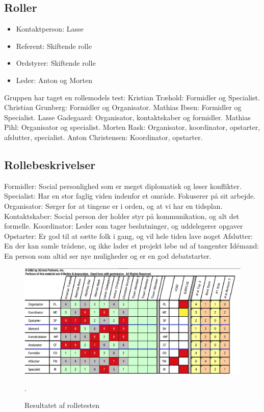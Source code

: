 \documentclass[oneside,a4paper,titlepage]{article}
\begin{document}
\subsection*{Roller}
\begin{itemize}
  \item Kontaktperson: Lasse
  \item Referent: Skiftende rolle
  \item Ordstyrer: Skiftende rolle
  \item Leder: Anton og Morten
\end{itemize}
Gruppen har taget en rollemodels test: \newline
Kristian Træhold: Formidler og Specialist. \newline
Christian Grunberg: Formidler og Organisator.\newline
Mathias Ibsen: Formidler og Specialist.\newline
Lasse Gadegaard: Organisator, kontaktskaber og formidler.\newline
Mathias Pihl: Organisator og specialist.\newline
Morten Rask: Organisator, koordinator, opstarter, afslutter, specialist.\newline
Anton Christensen: Koordinator, opstarter.\newline

\subsection*{Rollebeskrivelser}
Formidler: Social personlighed som er meget diplomatisk og løser konflikter.
Specialist: Har en stor faglig viden indenfor et område. Fokuserer på sit arbejde.
Organisator: Sørger for at tingene er i orden, og at vi har en tidsplan.
Kontaktskaber: Social person der holder styr på kommunikation, og alt det formelle.
Koordinator: Leder som tager beslutninger, og uddelegerer opgaver
Opstarter: Er god til at sætte folk i gang, og vil hele tiden lave noget
Afslutter: En der kan samle trådene, og ikke lader et projekt løbe ud af tangenter
Idémand: En person som altid ser nye muligheder og er en god debatstarter.

\begin{figure}[H]
   \centering
   \includegraphics[width=15cm]{graphics/rolletest}
   \caption{Resultatet af rolletesten}.
\end{figure}
\end{document}
